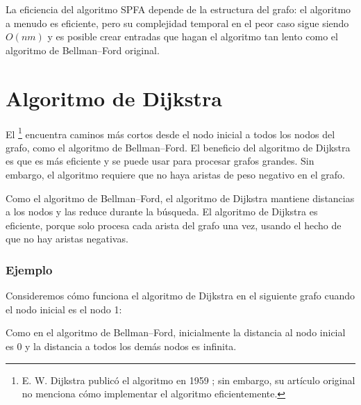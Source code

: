 La eficiencia del algoritmo SPFA depende
de la estructura del grafo:
el algoritmo a menudo es eficiente,
pero su complejidad temporal en el peor caso sigue siendo
$O(nm)$ y es posible crear entradas
que hagan el algoritmo tan lento como el
algoritmo de Bellman–Ford original.

\section{Algoritmo de Dijkstra}


El \footnote{E. W. Dijkstra publicó el algoritmo en 1959 \cite{dij59};
sin embargo, su artículo original no menciona cómo implementar el algoritmo eficientemente.}
encuentra caminos
más cortos desde el nodo inicial a todos los nodos del grafo,
como el algoritmo de Bellman–Ford.
El beneficio del algoritmo de Dijkstra es que
es más eficiente y se puede usar para
procesar grafos grandes.
Sin embargo, el algoritmo requiere que no
haya aristas de peso negativo en el grafo.

Como el algoritmo de Bellman–Ford,
el algoritmo de Dijkstra mantiene distancias
a los nodos y las reduce durante la búsqueda.
El algoritmo de Dijkstra es eficiente, porque
solo procesa
cada arista del grafo una vez, usando el hecho
de que no hay aristas negativas.

\subsubsection{Ejemplo}

Consideremos cómo funciona el algoritmo de Dijkstra
en el siguiente grafo cuando el
nodo inicial es el nodo 1:
\begin{center}
\end{center}
Como en el algoritmo de Bellman–Ford,
inicialmente la distancia al nodo inicial es 0
y la distancia a todos los demás nodos es infinita.


